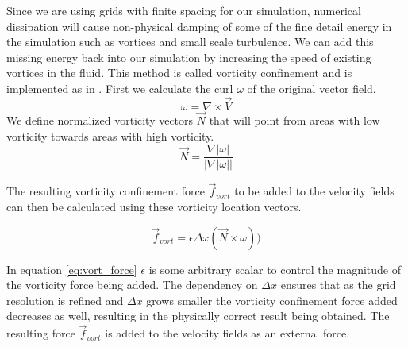 Since we are using grids with finite spacing for our simulation, numerical dissipation will cause non-physical damping of some of the fine detail energy in the simulation such as vortices and small scale turbulence. We can add this missing energy back into our simulation by increasing the speed of existing vortices in the fluid. This method is called vorticity confinement and is implemented as in \cite{Nguyen02}. First we calculate the curl $\omega$ of the original vector field.
\begin{equation}
\label{eq:vorticity}
\omega = \nabla \times \vec{V}
\end{equation}
We define normalized vorticity vectors $\vec{N}$ that will point from areas with low vorticity towards areas with high vorticity.
\begin{equation}
\label{eq:vort_loc_vec}
\vec{N} = \frac{\nabla |\omega|}{|\nabla |\omega ||}
\end{equation}

The resulting vorticity confinement force $\vec{f}_{vort}$ to be added to the velocity fields can then be calculated using these vorticity location vectors.

\begin{equation}
\label{eq:vort_force}
	\vec{f}_{vort} = \epsilon\Delta x(\vec{N}\times\omega))
\end{equation}

In equation \ref{eq:vort_force} $\epsilon$ is some arbitrary scalar to control the magnitude of the vorticity force being added. The dependency on $\Delta x$ ensures that as the grid resolution is refined and $\Delta x$ grows smaller the vorticity confinement force added decreases as well, resulting in the physically correct result being obtained. The resulting force $\vec{f}_{vort}$ is added to the velocity fields as an external force.